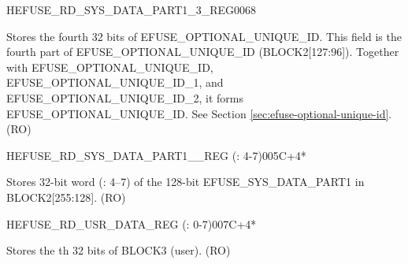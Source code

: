 \begin{register}{H}{EFUSE\_RD\_SYS\_DATA\_PART1\_3\_REG}{\hexprefix{}0068}\label{regdesc:EFUSERDSYSDATAPART13REG}
%
\regnewline%
\begin{regdesc}\begin{reglist}
\label{fielddesc:EFUSEOPTIONALUNIQUEID3}\item [EFUSE\_OPTIONAL\_UNIQUE\_ID\_3] Stores the fourth 32 bits of EFUSE\_OPTIONAL\_UNIQUE\_ID. This field is the fourth part of EFUSE\_OPTIONAL\_UNIQUE\_ID (BLOCK2[127:96]). Together with EFUSE\_OPTIONAL\_UNIQUE\_ID, EFUSE\_OPTIONAL\_UNIQUE\_ID\_1, and EFUSE\_OPTIONAL\_UNIQUE\_ID\_2, it forms EFUSE\_OPTIONAL\_UNIQUE\_ID. See Section \ref{sec:efuse-optional-unique-id}. (RO)
\end{reglist}\end{regdesc}
\end{register}


\begin{register}{H}{EFUSE\_RD\_SYS\_DATA\_PART1\_\_REG (: 4-7)}{\hexprefix{}005C+4*}\label{regdesc:EFUSERDSYSDATAPART1DATA4TO7REG}
%
\regnewline%
\begin{regdesc}\begin{reglist}
\label{fielddesc:EFUSESYSDATAPART1N}\item [EFUSE\_SYS\_DATA\_PART1\_\regindex{n}] Stores 32-bit word  (: 4–7) of the 128-bit EFUSE\_SYS\_DATA\_PART1 in BLOCK2[255:128]. (RO)
\end{reglist}\end{regdesc}
\end{register}


\begin{register}{H}{EFUSE\_RD\_USR\_DATA\_REG (: 0-7)}{\hexprefix{}007C+4*}\label{regdesc:EFUSERDUSRDATANREG}
%
\regnewline%
\begin{regdesc}\begin{reglist}
\label{fielddesc:EFUSEUSRDATAN}\item [EFUSE\_USR\_DATA\regindex{n}] Stores the th 32 bits of BLOCK3 (user). (RO)
\end{reglist}\end{regdesc}
\end{register}


